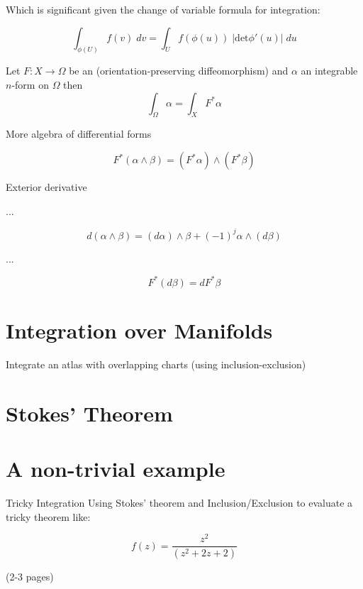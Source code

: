 Which is significant given the change of variable formula for integration:

\begin{equation}
\int_{\phi(U)} \! f(v) \; dv = \int_U \! f(\phi(u)) \; |\text{det}\phi'(u)| \; du
\end{equation}

\begin{theorem}
Let $F : X  \to \Omega$ be an (orientation-preserving diffeomorphism) and $\alpha$ an integrable $n$-form on $\Omega$ then
\begin{equation}
\int_\Omega \alpha = \int_X F^* \alpha
\end{equation}
\end{theorem}

More algebra of differential forms

\begin{equation}
F^* (\alpha \wedge \beta ) = (F^* \alpha) \wedge (F^* \beta)
\end{equation}

\begin{definition}
Exterior derivative
\end{definition}

...

\begin{equation}
d(\alpha \wedge \beta) = (d \alpha) \wedge \beta + (-1)^j \alpha \wedge ( d \beta)
\end{equation}

...

\begin{equation}
F^* (d \beta ) = dF^* \beta
\end{equation}

\section{Integration over Manifolds}

\begin{example}
Integrate an atlas with overlapping charts (using inclusion-exclusion)
\end{example}


\section{Stokes' Theorem}

\newpage

\section{A non-trivial example}
\begin{example}{Tricky Integration}
Using Stokes' theorem and Inclusion/Exclusion to evaluate a tricky theorem like:

\begin{equation}
f(z) = \frac{z^2}{(z^2 + 2z + 2)}
\end{equation}


 (2-3 pages)


\end{example}

\newpage
